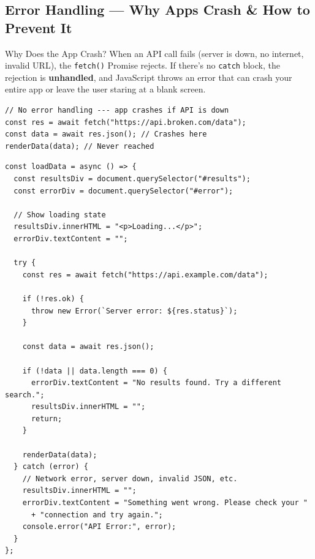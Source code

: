 \documentclass[12pt]{article}
\begin{document}
\subsection{Error Handling --- Why Apps Crash \& How to Prevent It}

\begin{conceptbox}{Why Does the App Crash?}
When an API call fails (server is down, no internet, invalid URL), the \texttt{fetch()} Promise rejects. If there's no \texttt{catch} block, the rejection is \textbf{unhandled}, and JavaScript throws an error that can crash your entire app or leave the user staring at a blank screen.
\end{conceptbox}

\begin{badway}
\begin{lstlisting}
// No error handling --- app crashes if API is down
const res = await fetch("https://api.broken.com/data");
const data = await res.json(); // Crashes here
renderData(data); // Never reached
\end{lstlisting}
\end{badway}

\begin{proway}
\begin{lstlisting}
const loadData = async () => {
  const resultsDiv = document.querySelector("#results");
  const errorDiv = document.querySelector("#error");

  // Show loading state
  resultsDiv.innerHTML = "<p>Loading...</p>";
  errorDiv.textContent = "";

  try {
    const res = await fetch("https://api.example.com/data");

    if (!res.ok) {
      throw new Error(`Server error: ${res.status}`);
    }

    const data = await res.json();

    if (!data || data.length === 0) {
      errorDiv.textContent = "No results found. Try a different search.";
      resultsDiv.innerHTML = "";
      return;
    }

    renderData(data);
  } catch (error) {
    // Network error, server down, invalid JSON, etc.
    resultsDiv.innerHTML = "";
    errorDiv.textContent = "Something went wrong. Please check your "
      + "connection and try again.";
    console.error("API Error:", error);
  }
};
\end{lstlisting}
\end{proway}
\end{document}
